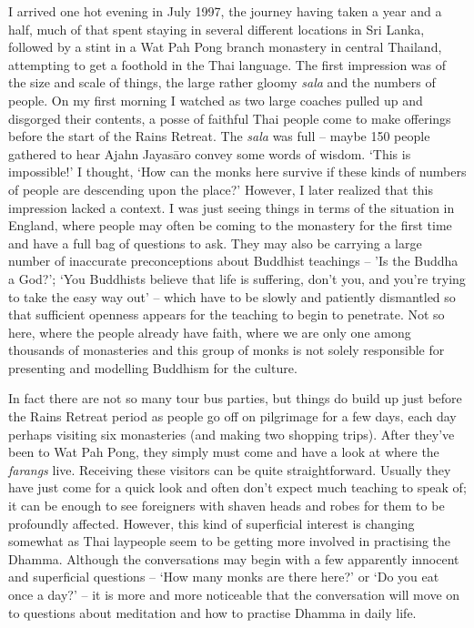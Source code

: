 I arrived one hot evening in July 1997, the journey having taken a year
and a half, much of that spent staying in several different locations in
Sri Lanka, followed by a stint in a Wat Pah Pong branch monastery in
central Thailand, attempting to get a foothold in the Thai language. The
first impression was of the size and scale of things, the large rather
gloomy \emph{sala} and the numbers of people. On my first morning I
watched as two large coaches pulled up and disgorged their contents, a
posse of faithful Thai people come to make offerings before the start of
the Rains Retreat. The \emph{sala} was full -- maybe 150 people
gathered to hear Ajahn Jayasāro convey some words of wisdom. `This is
impossible!' I thought, `How can the monks here survive if these kinds
of numbers of people are descending upon the place?' However, I later
realized that this impression lacked a context. I was just seeing things
in terms of the situation in England, where people may often be coming
to the monastery for the first time and have a full bag of questions to
ask. They may also be carrying a large number of inaccurate
preconceptions about Buddhist teachings -- 'Is the Buddha a God?'; `You
Buddhists believe that life is suffering, don't you, and you're trying
to take the easy way out' -- which have to be slowly and patiently
dismantled so that sufficient openness appears for the teaching to begin
to penetrate. Not so here, where the people already have faith, where we
are only one among thousands of monasteries and this group of monks is
not solely responsible for presenting and modelling Buddhism for the
culture.

In fact there are not so many tour bus parties, but things do build up
just before the Rains Retreat period as people go off on pilgrimage for
a few days, each day perhaps visiting six monasteries (and making two
shopping trips). After they've been to Wat Pah Pong, they simply must
come and have a look at where the \emph{farangs} live. Receiving these
visitors can be quite straightforward. Usually they have just come for a
quick look and often don't expect much teaching to speak of; it can be
enough to see foreigners with shaven heads and robes for them to be
profoundly affected. However, this kind of superficial interest is
changing somewhat as Thai laypeople seem to be getting more involved in
practising the Dhamma. Although the conversations may begin with a few
apparently innocent and superficial questions -- `How many monks are
there here?' or `Do you eat once a day?' -- it is more and more
noticeable that the conversation will move on to questions about
meditation and how to practise Dhamma in daily life.

